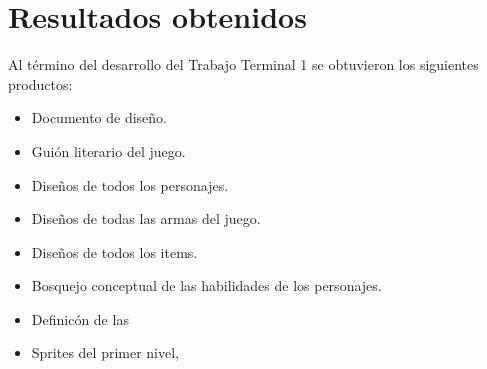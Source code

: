 \chapter{Resultados obtenidos}
Al término del desarrollo del Trabajo Terminal 1 se obtuvieron los siguientes 
productos:
	\begin{itemize}
		\item Documento de diseño.
		\item Guión literario del juego.
		\item Diseños de todos los personajes.
		\item Diseños de todas las armas del juego.
		\item Diseños de todos los items.
		\item Bosquejo conceptual de las habilidades de los personajes.
		\item Definicón de las 
		\item  Sprites del primer nivel, 
	\end{itemize}